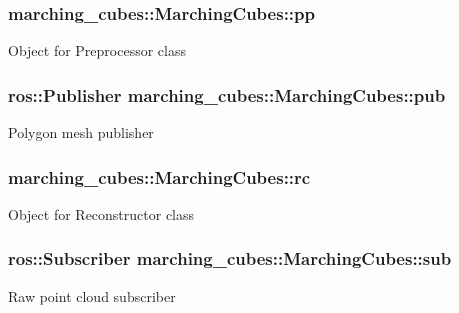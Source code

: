 \subsubsection[{\texorpdfstring{pp}{pp}}]{ marching\+\_\+cubes\+::\+Marching\+Cubes\+::pp\hspace{0.3cm}{\ttfamily [private]}}\hypertarget{classmarching__cubes_1_1_marching_cubes_a72ffa2bde7429caf094e1e50b7e839dd}{}\label{classmarching__cubes_1_1_marching_cubes_a72ffa2bde7429caf094e1e50b7e839dd}
Object for Preprocessor class 
\subsubsection[{\texorpdfstring{pub}{pub}}]{\setlength{\rightskip}{0pt plus 5cm}ros\+::\+Publisher marching\+\_\+cubes\+::\+Marching\+Cubes\+::pub\hspace{0.3cm}{\ttfamily [private]}}\hypertarget{classmarching__cubes_1_1_marching_cubes_afb0123959f5be68d13e50a77c0e6cd11}{}\label{classmarching__cubes_1_1_marching_cubes_afb0123959f5be68d13e50a77c0e6cd11}
Polygon mesh publisher 
\subsubsection[{\texorpdfstring{rc}{rc}}]{ marching\+\_\+cubes\+::\+Marching\+Cubes\+::rc\hspace{0.3cm}{\ttfamily [private]}}\hypertarget{classmarching__cubes_1_1_marching_cubes_a80dcffe7ec661fb3fc85edbdebebc0db}{}\label{classmarching__cubes_1_1_marching_cubes_a80dcffe7ec661fb3fc85edbdebebc0db}
Object for Reconstructor class 
\subsubsection[{\texorpdfstring{sub}{sub}}]{\setlength{\rightskip}{0pt plus 5cm}ros\+::\+Subscriber marching\+\_\+cubes\+::\+Marching\+Cubes\+::sub\hspace{0.3cm}{\ttfamily [private]}}\hypertarget{classmarching__cubes_1_1_marching_cubes_a7330eddbb78d73dc9aa809354985cee1}{}\label{classmarching__cubes_1_1_marching_cubes_a7330eddbb78d73dc9aa809354985cee1}
Raw point cloud subscriber 

